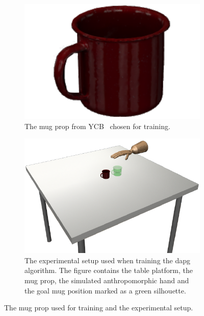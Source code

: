 \begin{figure}[!h]
	\centering
	\begin{subfigure}[b]{0.48\textwidth}
		\centering
		\includegraphics[width=\textwidth]{chapters/3-in-hand-manipulation/fig/mug.pdf}
		\caption{The mug prop from YCB~\cite{ycb} chosen for training.\newline}
		\label{fig:fig:manipulation-mug}
	\end{subfigure}
	\hfill
	\begin{subfigure}[b]{0.48\textwidth}
		\centering
		\includegraphics[width=\textwidth]{chapters/3-in-hand-manipulation/fig/experimental-setup-dapg.pdf}
		\caption{The experimental setup used when training the \gls{dapg} algorithm. The figure contains the table platform, the mug prop, the simulated anthropomorphic hand and the goal mug position marked as a green silhouette.}
		\label{fig:experimental-setup-dapg}
	\end{subfigure}
	\caption{The mug prop used for training and the experimental setup.}
	\label{fig:manipulation-mug-experimental-setup-dapg}
\end{figure}

